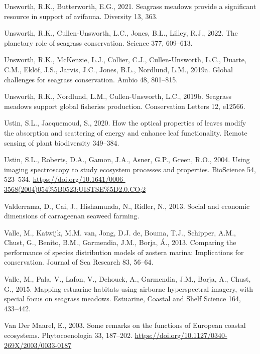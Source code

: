 \documentclass[
  letterpaper,
  11pt,
  english,
  singlespacing,
  headsepline]{MastersDoctoralThesis}
\newlength{\cslhangindent}
\newenvironment{CSLReferences}[2] %
 {\begin{list}{}{%
  \setlength{\itemindent}{0pt}
  \setlength{\leftmargin}{0pt}
  \setlength{\parsep}{0pt}
  \ifodd #1
   \setlength{\leftmargin}{\cslhangindent}
   \setlength{\itemindent}{-1\cslhangindent}
  \fi
  \setlength{\itemsep}{#2\baselineskip}}}
 {\end{list}}
\begin{document}
\begin{CSLReferences}{1}{0}
Unsworth, R.K., Butterworth, E.G., 2021. Seagrass meadows provide a
significant resource in support of avifauna. Diversity 13, 363.

Unsworth, R.K., Cullen-Unsworth, L.C., Jones, B.L., Lilley, R.J., 2022.
The planetary role of seagrass conservation. Science 377, 609--613.

Unsworth, R.K., McKenzie, L.J., Collier, C.J., Cullen-Unsworth, L.C.,
Duarte, C.M., Eklöf, J.S., Jarvis, J.C., Jones, B.L., Nordlund, L.M.,
2019a. Global challenges for seagrass conservation. Ambio 48, 801--815.

Unsworth, R.K., Nordlund, L.M., Cullen-Unsworth, L.C., 2019b. Seagrass
meadows support global fisheries production. Conservation Letters 12,
e12566.

Ustin, S.L., Jacquemoud, S., 2020. How the optical properties of leaves
modify the absorption and scattering of energy and enhance leaf
functionality. Remote sensing of plant biodiversity 349--384.

Ustin, S.L., Roberts, D.A., Gamon, J.A., Asner, G.P., Green, R.O., 2004.
{Using imaging spectroscopy to study ecosystem processes and
properties}. BioScience 54, 523--534.
\url{https://doi.org/10.1641/0006-3568(2004)054\%5B0523:UISTSE\%5D2.0.CO;2}

Valderrama, D., Cai, J., Hishamunda, N., Ridler, N., 2013. Social and
economic dimensions of carrageenan seaweed farming.

Valle, M., Katwijk, M.M. van, Jong, D.J. de, Bouma, T.J., Schipper,
A.M., Chust, G., Benito, B.M., Garmendia, J.M., Borja, Á., 2013.
Comparing the performance of species distribution models of zostera
marina: Implications for conservation. Journal of Sea Research 83,
56--64.

Valle, M., Pala, V., Lafon, V., Dehouck, A., Garmendia, J.M., Borja, A.,
Chust, G., 2015. Mapping estuarine habitats using airborne hyperspectral
imagery, with special focus on seagrass meadows. Estuarine, Coastal and
Shelf Science 164, 433--442.

Van Der Maarel, E., 2003. {Some remarks on the functions of European
coastal ecosystems}. Phytocoenologia 33, 187--202.
\url{https://doi.org/10.1127/0340-269X/2003/0033-0187}


\end{CSLReferences}
\end{document}
